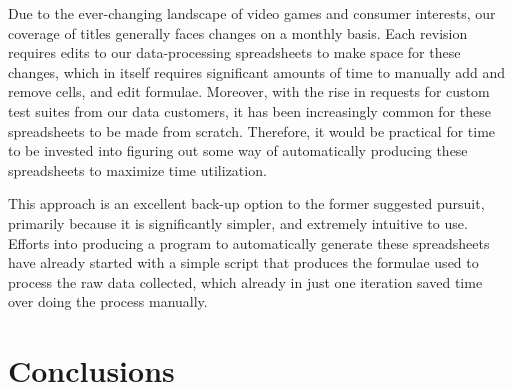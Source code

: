 \documentclass[12pt]{article}
\begin{document}
	Due to the ever-changing landscape of video games and consumer interests, our coverage of titles generally faces changes on a monthly basis. Each revision requires edits to our data-processing spreadsheets to make space for these changes, which in itself requires significant amounts of time to manually add and remove cells, and edit formulae. Moreover, with the rise in requests for custom test suites from our data customers, it has been increasingly common for these spreadsheets to be made from scratch. Therefore, it would be practical for time to be invested into figuring out some way of automatically producing these spreadsheets to maximize time utilization.
	
	This approach is an excellent back-up option to the former suggested pursuit, primarily because it is significantly simpler, and extremely intuitive to use. Efforts into producing a program to automatically generate these spreadsheets have already started with a simple script that produces the formulae used to process the raw data collected, which already in just one iteration saved time over doing the process manually.





\newpage
\section{Conclusions}

\end{document}
